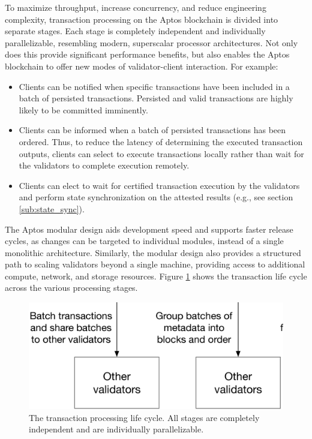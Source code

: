 \documentclass{article}
\begin{document}
To maximize throughput, increase concurrency, and reduce engineering complexity, transaction processing on the Aptos blockchain is divided into separate stages. Each stage is completely independent and individually parallelizable, resembling modern, superscalar processor architectures. Not only does this provide significant performance benefits, but also enables the Aptos blockchain to offer new modes of validator-client interaction. For example:
\begin{itemize}
\item Clients can be notified when specific transactions have been included in a batch of persisted transactions. Persisted and valid transactions are highly likely to be committed imminently.
\item Clients can be informed when a batch of persisted transactions has been ordered. Thus, to reduce the latency of determining the executed transaction outputs, clients can select to execute transactions locally rather than wait for the validators to complete execution remotely.
\item Clients can elect to wait for certified transaction execution by the validators and perform state synchronization on the attested results (e.g., see section \ref{sub:state_sync}).
\end{itemize}
The Aptos modular design aids development speed and supports faster release cycles, as changes can be targeted to individual modules, instead of a single monolithic architecture. Similarly, the modular design also provides a structured path to scaling validators beyond a single machine, providing access to additional compute, network, and storage resources. Figure \ref{fig:pipeline} shows the transaction life cycle across the various processing stages.

\begin{figure}
\centering
\includegraphics[width=1.0\textwidth]{pipeline.eps}
\caption{\label{fig:pipeline}The transaction processing life cycle. All stages are completely independent and are individually parallelizable.}
\end{figure}
\end{document}
